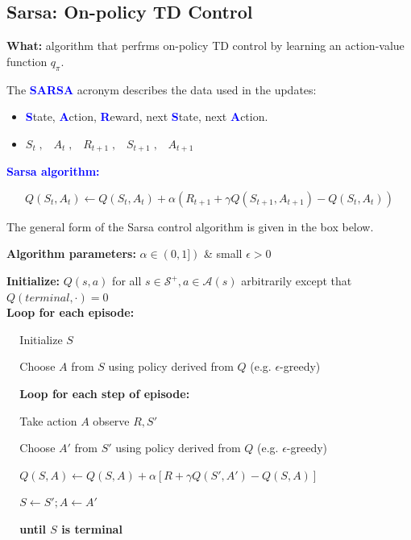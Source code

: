 \documentclass[12pt, a4paper]{article}
\begin{document}
\subsection{Sarsa: On-policy TD Control}\label{sarsa}

\textbf{What:} algorithm that perfrms on-policy TD control by learning an action-value function $q_\pi$.

The \textbf{\textcolor{blue}{SARSA}} acronym describes the data used in the updates:
\begin{itemize}
  \item \textbf{\textcolor{blue}{S}}tate, \textbf{\textcolor{blue}{A}}ction, \textbf{\textcolor{blue}{R}}eward, next \textbf{\textcolor{blue}{S}}tate, next \textbf{\textcolor{blue}{A}}ction.
  \item $S_t \;, \;\;\; A_t \;, \;\;\; R_{t+1} \;, \;\;\; S_{t+1} \;, \;\;\; A_{t+1}$
\end{itemize}


\textbf{\textcolor{blue}{Sarsa algorithm:}}

$$
Q(S_t, A_t) \leftarrow Q(S_t, A_t) + \alpha (R_{t+1} + \gamma Q(S_{t+1}, A_{t+1}) - Q(S_t, A_t))
$$

The general form of the Sarsa control algorithm is given in the box below.

\begin{tcolorbox}[title={Sarsa (on-policy TD control) for estimating $Q \approx q_*$}]

\textbf{Algorithm parameters:} $\alpha \in (0,1])$ \& small $\epsilon > 0$

\textbf{Initialize:} $Q(s, a)$ for all $s \in \mathcal{S}^+, a \in \mathcal{A}(s)$ arbitrarily except that $Q(terminal, \cdot) = 0$ \\

\textbf{Loop for each episode:}
\begin{description}
   \item $\;\;\;$ Initialize $S$
   \item $\;\;\;$ Choose $A$ from $S$ using policy derived from $Q$ (e.g. $\epsilon$-greedy)
   \item $\;\;\;$ \textbf{Loop for each step of episode:}
   \begin{description}
     \item $\;\;\;$ Take action $A$ observe $R, S'$
     \item $\;\;\;$ Choose $A'$ from $S'$ using policy derived from $Q$ (e.g. $\epsilon$-greedy)
     \item $\;\;\;$ $Q(S, A) \leftarrow Q(S, A) + \alpha [R + \gamma Q(S', A') - Q(S, A)]$
     \item $\;\;\;$ $S \leftarrow S'; A \leftarrow A'$
   \end{description}
   \item $\;\;\;$ \textbf{until $S$ is terminal}
\end{description}
\end{tcolorbox}
\end{document}

